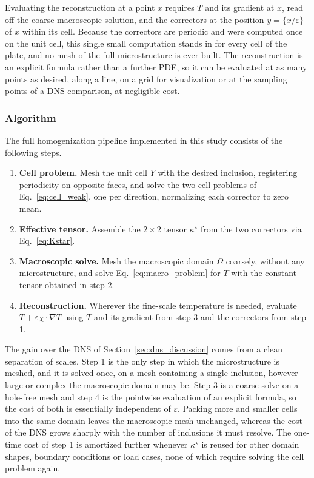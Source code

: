\documentclass{article}
\makeatletter
\providecommand\FloatBarrier{\par\begingroup\let\@elt\relax
  \edef\@tempa{\@botlist\@deferlist\@dbldeferlist}%
  \ifx\@tempa\@empty\else\clearpage\fi\endgroup}
\newenvironment{enumeratenumeric}{\begin{enumerate}[1.] }{\end{enumerate}}
\makeatother
\begin{document}
Evaluating the reconstruction at a point $x$ requires $T$ and its gradient at
$x$, read off the coarse macroscopic solution, and the correctors at the
position $y = \{ x / \varepsilon \}$ of $x$ within its cell. Because the
correctors are periodic and were computed once on the unit cell, this single
small computation stands in for every cell of the plate, and no mesh of the
full microstructure is ever built. The reconstruction is an explicit formula
rather than a further PDE, so it can be evaluated at as many points as
desired, along a line, on a grid for visualization or at the sampling points
of a DNS comparison, at negligible cost.

\FloatBarrier
\subsubsection{Algorithm}
\label{sec:algorithm}

The full homogenization pipeline implemented in this study consists of the
following steps.
\begin{enumeratenumeric}
  \item \textbf{Cell problem.} Mesh the unit cell $Y$ with the desired
  inclusion, registering periodicity on opposite faces, and solve the two cell
  problems of Eq.~\eqref{eq:cell_weak}, one per direction, normalizing each
  corrector to zero mean.
  
  \item \textbf{Effective tensor.} Assemble the $2 \times 2$ tensor
  $\kappa^{\star}$ from the two correctors via Eq.~\eqref{eq:Kstar}.
  
  \item \textbf{Macroscopic solve.} Mesh the macroscopic domain $\Omega$ coarsely,
  without any microstructure, and solve Eq.~\eqref{eq:macro_problem} for $T$
  with the constant tensor obtained in step 2.
  
  \item \textbf{Reconstruction.} Wherever the fine-scale temperature is needed,
  evaluate $T + \varepsilon \chi \cdot \nabla T$ using $T$ and its gradient from
  step 3 and the correctors from step 1.
\end{enumeratenumeric}
The gain over the DNS of Section~\ref{sec:dns_discussion} comes from a clean
separation of scales. Step 1 is the only step in which the microstructure is
meshed, and it is solved once, on a mesh containing a single inclusion,
however large or complex the macroscopic domain may be. Step 3 is a coarse
solve on a hole-free mesh and step 4 is the pointwise evaluation of an explicit
formula, so the cost of both is essentially independent of $\varepsilon$. Packing
more and smaller cells into the same domain leaves the macroscopic mesh
unchanged, whereas the cost of the DNS grows sharply with the number of
inclusions it must resolve. The one-time cost of step 1 is amortized further
whenever $\kappa^{\star}$ is reused for other domain shapes, boundary conditions
or load cases, none of which require solving the cell problem again.
\end{document}
